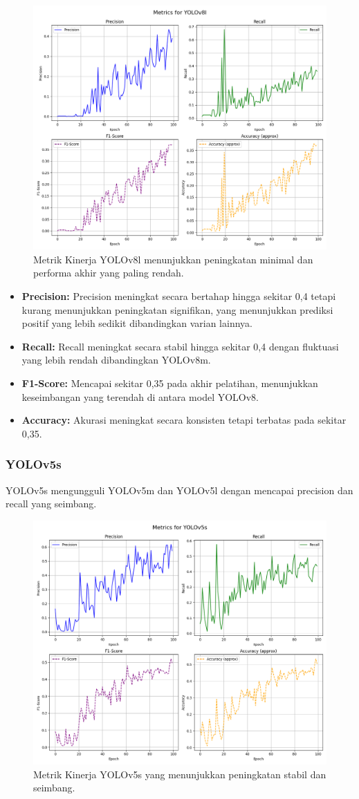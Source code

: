 \documentclass[12pt,a4paper]{article}
\begin{document}
\begin{figure}[H]
    \centering
    \includegraphics[width=0.6\linewidth]{assets/yolov8l_metrics.png}
    \caption{Metrik Kinerja YOLOv8l menunjukkan peningkatan minimal dan performa akhir yang paling rendah.}
    \label{fig:yolov8l}
\end{figure}


\begin{itemize}
    \item \textbf{Precision:} Precision meningkat secara bertahap hingga sekitar 0,4 tetapi kurang menunjukkan peningkatan signifikan, yang menunjukkan prediksi positif yang lebih sedikit dibandingkan varian lainnya.
    \item \textbf{Recall:} Recall meningkat secara stabil hingga sekitar 0,4 dengan fluktuasi yang lebih rendah dibandingkan YOLOv8m.
    \item \textbf{F1-Score:} Mencapai sekitar 0,35 pada akhir pelatihan, menunjukkan keseimbangan yang terendah di antara model YOLOv8.
    \item \textbf{Accuracy:} Akurasi meningkat secara konsisten tetapi terbatas pada sekitar 0,35.
\end{itemize}

\subsubsection{YOLOv5s}
YOLOv5s mengungguli YOLOv5m dan YOLOv5l dengan mencapai precision dan recall yang seimbang.  

\begin{figure}[H]
    \centering
    \includegraphics[width=0.6\linewidth]{assets/yolov5s_metrics.png}
    \caption{Metrik Kinerja YOLOv5s yang menunjukkan peningkatan stabil dan seimbang.}
    \label{fig:yolov5s}
\end{figure}
\end{document}
